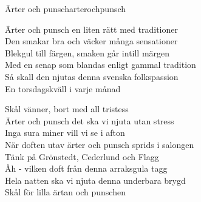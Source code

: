 \begin{song}{Ärter och punsch}{arterochpunsch}
\begin{vers}
Ärter och punsch en liten rätt med traditioner\\
Den smakar bra och väcker många sensationer\\
Blekgul till färgen, smaken går intill märgen\\
Med en senap som blandas enligt gammal tradition\\
Så skall den njutas denna svenska folkspassion\\
En torsdagskväll i varje månad\\
\end{vers}
\begin{vers}
Skål vänner, bort med all tristess\\
Ärter och punsch det ska vi njuta utan stress\\
Inga sura miner vill vi se i afton\\
När doften utav ärter och punsch sprids i salongen\\
Tänk på Grönstedt, Cederlund och Flagg\\
Åh - vilken doft från denna arraksgula tagg\\
Hela natten ska vi njuta denna underbara brygd\\
Skål för lilla ärtan och punschen\\
\end{vers}
\end{song}
